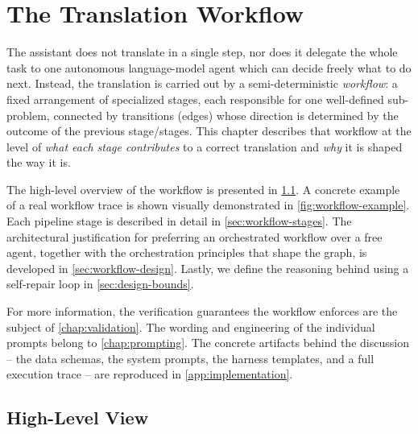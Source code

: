 \chapter{The Translation Workflow}
\label{chap:workflow}

The assistant does not translate in a single step, nor does it delegate the whole task to one autonomous language-model agent which can decide freely what to do next. Instead, the translation is carried out by a semi-deterministic \emph{workflow}: a fixed arrangement of specialized stages, each responsible for one well-defined sub-problem, connected by transitions (edges) whose direction is determined by the outcome of the previous stage/stages. This chapter describes that workflow at the level of \emph{what each stage contributes} to a correct translation and \emph{why} it is shaped the way it is.

The high-level overview of the workflow is presented in \cref{sec:workflow-overview}. A concrete example of a real workflow trace is shown visually demonstrated in \cref{fig:workflow-example}. Each pipeline stage is described in detail in \cref{sec:workflow-stages}. The architectural justification for preferring an orchestrated workflow over a free agent, together with the orchestration principles that shape the graph, is developed in \cref{sec:workflow-design}. Lastly, we define the reasoning behind using a self-repair loop in \cref{sec:design-bounds}. 

For more information, the verification guarantees the workflow enforces are the subject of \cref{chap:validation}. The wording and engineering of the individual prompts belong to \cref{chap:prompting}. The concrete artifacts behind the discussion -- the data schemas, the system prompts, the harness templates, and a full execution trace -- are reproduced in \cref{app:implementation}.

\section{High-Level View}
\label{sec:workflow-overview}

